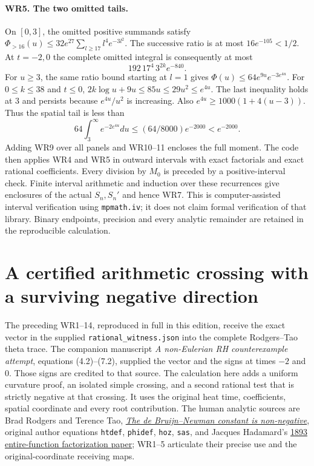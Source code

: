 \documentclass[11pt,a4paper]{article}
\theoremstyle{definition}\newtheorem{definition}[theorem]{Definition}
\begin{document}
\paragraph{WR5. The two omitted tails.}
On $[0,3]$, the omitted positive summands satisfy
$\Phi_{>16}(u)\le32e^{27}\sum_{l\ge17}l^4e^{-3l^2}$.
The successive ratio is at most $16e^{-105}<1/2$. At $t=-2,0$
the complete omitted integral is consequently at most
\[
 192\,17^4\,3^{2k}e^{-840}.
 \tag{WR10}
\]
For $u\ge3$, the same ratio bound starting at $l=1$ gives
$\Phi(u)\le64e^{9u}e^{-3e^{4u}}$.
For $0\le k\le38$ and $t\le0$,
$2k\log u+9u\le85u\le29u^2\le e^{4u}$.
The last inequality holds at $3$ and persists because
$e^{4u}/u^2$ is increasing. Also
$e^{4u}\ge1000(1+4(u-3))$. Thus the spatial tail is less than
\[
 64\int_3^\infty e^{-2e^{4u}}du
 \le(64/8000)e^{-2000}<e^{-2000}.
 \tag{WR11}
\]
Adding WR9 over all panels and WR10--11 encloses the full
moment. The code then applies WR4 and WR5 in outward intervals
with exact factorials and exact rational coefficients. Every
division by $M_0$ is preceded by a positive-interval check.
Finite interval arithmetic and induction over these recurrences
give enclosures of the actual $S_n,S_n'$ and hence WR7.
This is computer-assisted interval verification using
\texttt{mpmath.iv}; it does not claim formal verification of
that library. Binary endpoints, precision and every analytic
remainder are retained in the reproducible calculation.


\section{A certified arithmetic crossing with a surviving negative direction}
\label{sec:native-crossing}

The preceding WR1--14, reproduced in full in this edition, receive the
exact vector in the supplied \texttt{rational\_witness.json} into the
complete Rodgers--Tao theta trace. The companion manuscript
\emph{A non-Eulerian RH counterexample attempt}, equations (4.2)--(7.2),
supplied the vector and the signs at times $-2$ and $0$. Those signs
are credited to that source. The calculation here adds a uniform
curvature proof, an isolated simple crossing, and a second rational
test that is strictly negative at that crossing. It uses the original
heat time, coefficients, spatial coordinate and every root contribution.
The human analytic sources are Brad Rodgers and Terence Tao,
\href{https://arxiv.org/abs/1801.05914v5}{\emph{The de Bruijn--Newman
constant is non-negative}}, original author equations
\texttt{htdef}, \texttt{phidef}, \texttt{hoz}, \texttt{sas}, and
Jacques Hadamard's
\href{https://www.numdam.org/item/JMPA_1893_4_9__171_0/}{1893
entire-function factorization paper}; WR1--5 articulate their precise
use and the original-coordinate receiving maps.
\end{document}
